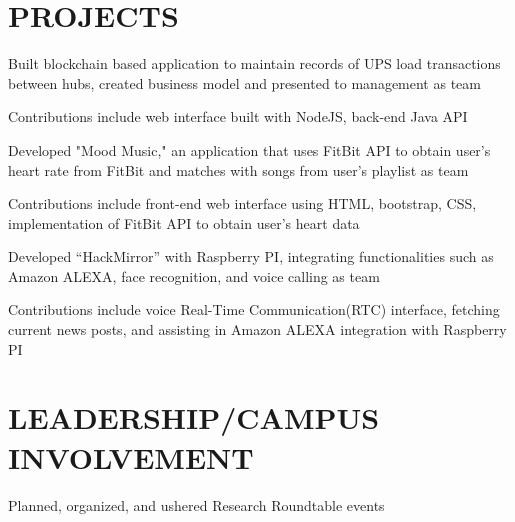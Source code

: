\documentclass[]{deedy-resume-openfont}
\begin{document}
\begin{minipage}[t]{0.67\textwidth}

\section {PROJECTS}

\begin{tightemize}
\item Built blockchain based application to maintain records of UPS load transactions between hubs, created business model and presented to management as team
\item Contributions include web interface built with NodeJS, back-end Java API
\end{tightemize}
\sectionsep

\descript{}
\begin{tightemize}
\item Developed "Mood Music," an application that uses FitBit API to obtain user's heart rate from FitBit and matches with songs from user's playlist as team
\item Contributions include front-end web interface using HTML, bootstrap, CSS, implementation of FitBit API to obtain user's heart data
\end{tightemize}
\sectionsep

\begin{tightemize}
\item Developed “HackMirror” with Raspberry PI, integrating functionalities such as Amazon ALEXA, face recognition, and voice calling as team
\item Contributions include voice Real-Time Communication(RTC) interface, fetching current news posts, and assisting in Amazon ALEXA integration with Raspberry PI
\end{tightemize}
\sectionsep

\section{LEADERSHIP/CAMPUS INVOLVEMENT} 

\begin{tightemize}
\item Planned, organized, and ushered Research Roundtable events
\end{tightemize}

\sectionsep

\sectionsep

\end{minipage} 
\end{document}
